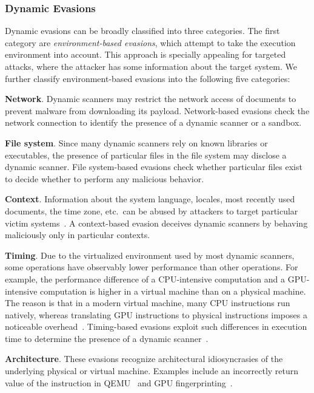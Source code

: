 \subsubsection{Dynamic Evasions}
Dynamic evasions can be broadly classified into three categories.
The first category are \emph{environment-based evasions}, which attempt to 
take the execution environment into account.
This approach is specially appealing for targeted attacks, where the 
attacker has some information about the target system. We further classify environment-based evasions 
into the following five categories:

\textbf{Network}.
    Dynamic scanners may restrict the network access of documents to prevent malware from downloading its payload.
    Network-based evasions check the network connection to identify the 
    presence of a dynamic scanner or a sandbox.
  
\textbf{File system}.
    Since many dynamic scanners rely on known libraries or executables, the 
    presence of particular files in the file system may disclose a dynamic 
    scanner.
    File system-based evasions check whether particular files exist to 
    decide whether to perform any malicious behavior.

\textbf{Context}.
    Information about the system language, locales, most recently used 
    documents, the time zone, etc.\ can be abused by attackers to target 
    particular victim systems~\cite{le2017broad, rasthofer2017making}.
    A context-based evasion deceives dynamic scanners by behaving 
    maliciously only in particular contexts.

\textbf{Timing}.
    Due to the virtualized environment used by most dynamic scanners, some 
    operations have observably lower performance than other operations.
    For example, the performance difference of a CPU-intensive computation
    and a GPU-intensive computation is higher in a virtual machine than on a 
    physical machine.
    The reason is that in a modern virtual machine, many CPU instructions 
    run natively, whereas translating GPU instructions to physical 
    instructions imposes a noticeable overhead~\cite{ho2014tick}.
    Timing-based evasions exploit such differences in execution time to 
    determine the presence of a dynamic scanner~\cite{timing_evasion}.
    
\textbf{Architecture}.
  These  evasions recognize architectural idiosyncrasies of the 
    underlying physical or virtual machine.
    Examples include an incorrectly return value of the  instruction in
    QEMU~\cite{ferrie2007attacks} and GPU fingerprinting~\cite{gpufingerprinting}.

